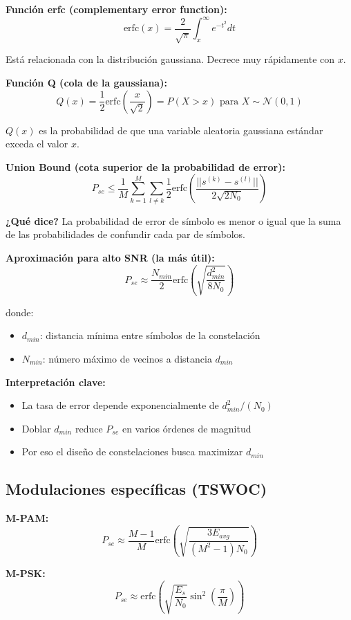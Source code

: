 \documentclass[10pt,a4paper]{article}
\begin{document}
\textbf{Función erfc (complementary error function):}
$$\text{erfc}(x) = \frac{2}{\sqrt{\pi}}\int_{x}^{\infty}e^{-t^2}dt$$

Está relacionada con la distribución gaussiana. Decrece muy rápidamente con $x$.

\textbf{Función Q (cola de la gaussiana):}
$$Q(x) = \frac{1}{2}\text{erfc}\left(\frac{x}{\sqrt{2}}\right) = P(X > x) \text{ para } X \sim \mathcal{N}(0,1)$$

$Q(x)$ es la probabilidad de que una variable aleatoria gaussiana estándar exceda el valor $x$.

\textbf{Union Bound (cota superior de la probabilidad de error):}
$$P_{se} \leq \frac{1}{M}\sum_{k=1}^{M}\sum_{l\neq k} \frac{1}{2}\text{erfc}\left(\frac{||s^{(k)} - s^{(l)}||}{2\sqrt{2N_0}}\right)$$

\textbf{¿Qué dice?} La probabilidad de error de símbolo es menor o igual que la suma de las probabilidades de confundir cada par de símbolos.

\textbf{Aproximación para alto SNR (la más útil):}
$$P_{se} \approx \frac{N_{min}}{2}\text{erfc}\left(\sqrt{\frac{d_{min}^2}{8N_0}}\right)$$

donde:
\begin{itemize}
\item $d_{min}$: distancia mínima entre símbolos de la constelación
\item $N_{min}$: número máximo de vecinos a distancia $d_{min}$
\end{itemize}

\textbf{Interpretación clave:}
\begin{itemize}
\item La tasa de error depende exponencialmente de $d_{min}^2/(N_0)$
\item Doblar $d_{min}$ reduce $P_{se}$ en varios órdenes de magnitud
\item Por eso el diseño de constelaciones busca maximizar $d_{min}$
\end{itemize}

\subsection{Modulaciones específicas (TSWOC)}

\textbf{M-PAM:}
$$P_{se} \approx \frac{M-1}{M}\text{erfc}\left(\sqrt{\frac{3E_{avg}}{(M^2-1)N_0}}\right)$$

\textbf{M-PSK:}
$$P_{se} \approx \text{erfc}\left(\sqrt{\frac{E_s}{N_0}}\sin^2\left(\frac{\pi}{M}\right)\right)$$
\end{document}
